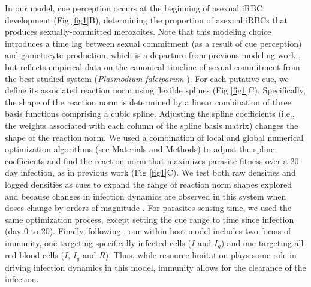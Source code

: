 \documentclass[10pt,letterpaper]{article}
\begin{document}
In our model, cue perception occurs at the beginning of asexual iRBC development (Fig \ref{fig1}B), determining the proportion of asexual iRBCs that produces sexually-committed merozoites. Note that this modeling choice introduces a time lag between sexual commitment (as a result of cue perception) and gametocyte production, which is a departure from previous modeling work \cite{greischar_predicting_2016}, but reflects empirical data on the canonical timeline of sexual commitment from the best studied system (\emph{Plasmodium falciparum} \cite{dixon_sex_2008}). For each putative cue, we define its associated reaction norm using flexible splines (Fig \ref{fig1}C). Specifically, the shape of the reaction norm is determined by a linear combination of three basis functions comprising a cubic spline. Adjusting the spline coefficients (i.e., the weights associated with each column of the spline basis matrix) changes the shape of the reaction norm. We used a combination of local and global numerical optimization algorithms (see Materials and Methods) to adjust the spline coefficients and find the reaction norm that maximizes parasite fitness over a 20-day infection, as in previous work \cite{greischar_predicting_2016, birget_altered_2018} (Fig \ref{fig1}C). We test both raw densities and logged densities as cues to expand the range of reaction norm shapes explored and because changes in infection dynamics are observed in this system when doses change by orders of magnitude \cite{timms_effect_2001}. For parasites sensing time, we used the same optimization process, except setting the cue range to time since infection (day 0 to 20). Finally, following \cite{kamiya_uncovering_2020}, our within-host model includes two forms of immunity, one targeting specifically infected cells ($I$ and $I_g$) and one targeting all red blood cells ($I$, $I_g$ and $R$). Thus, while resource limitation plays some role in driving infection dynamics in this model, immunity allows for the clearance of the infection.
\end{document}
